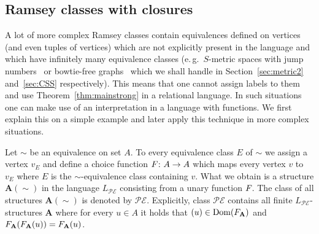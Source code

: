 \documentclass{elsarticle}
\newcommand{\eg}{e.\,g.}
\def\dom{\mathop{\mathrm{Dom}}\nolimits}
\def\str#1{\mathbf {#1}}
\def\func#1#2{\nbfunc{\ifstrempty{#1}{}{\str{#1}}}{#2}}
\def\nbfunc#1#2{F\ifstrempty{#1}{}{_{#1}}\ifstrempty{#2}{}{^{#2}}}
\theoremstyle{plain}
\theoremstyle{definition}
\theoremstyle{remark}
\begin{document}
\subsection {Ramsey classes with closures}
\label{sec:examplesclosure}
A lot of more complex Ramsey classes contain equivalences defined on vertices (and even tuples of vertices) which are not explicitly present in the language and which have infinitely many equivalence classes (\eg{}\ $S$-metric spaces with jump numbers~\cite{Sauer2013} or bowtie-free graphs~\cite{Hubivcka2014}
which we shall handle in Section~\ref{sec:metric2} and~\ref{sec:CSS} respectively). This means that one cannot assign labels to them and use Theorem~\ref{thm:mainstrong} in a relational language. In such situations one can make use of an interpretation in a language with functions. 
We first explain this on a simple example and later apply this technique in more complex situations.

\medskip

Let $\sim$ be an equivalence on set $A$. To every equivalence class $E$ of $\sim$ we assign a vertex $v_E$ and define a choice function $\func{}{}\colon A\to A$ which maps every vertex $v$ to $v_E$ where $E$ is the $\sim$-equivalence class containing $v$. What we obtain is a structure $\str{A}(\sim)$ in the language $L_{\mathcal {PE}}$ consisting from a unary function $\func{}{}$.
The class of all structures $\str{A}(\sim)$ is denoted by $\mathcal {PE}$. Explicitly,
class $\mathcal{PE}$ contains all finite $L_\mathcal{PE}$-structures $\str{A}$ where for every $u\in A$
it holds that $(u)\in\dom(\func{A}{})$ and $\func{A}{}(\func{A}{}(u))=\func{A}{}(u)$.
\end{document}
